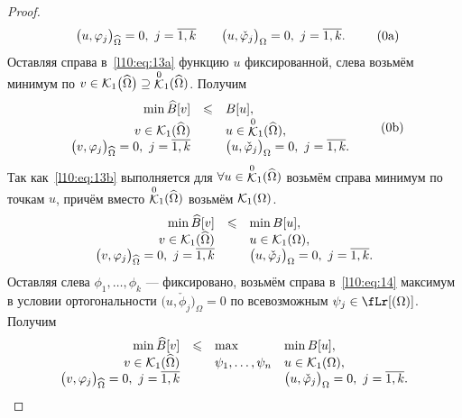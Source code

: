 \begin{proof}
\begin{equation}
\begin{array}{rcl}
			\big(u,\phi_j\big)_{\widehat{\Omega}}=0,\ j=\overline{1,k}&  &\big(u,\check{\phi}_j\big)_{\Omega}=0,\ j=\overline{1,k}.
		\end{array}\tag{\theequation a}\hfill
	\end{equation} 
	Оставляя справа в~\eqref{l10:eq:13a} функцию $u$ фиксированной, слева возьмём минимум по $v\in\mathcal{K}_1\big(\widehat{\Omega}\big)\supseteq{\mathop{\ensuremath{\mathcal{K}}}\limits^0}_1(\widehat{\Omega})$. Получим
	\begin{equation}\label{l10:eq:13b}
		\hfill\begin{array}{rcl}
			\min\widehat{B}[v]&\leqslant&B[u],\\
			v\in\K_1(\widehat{\Omega})& &u\in{\mathop{\K}\limits^0}_1(\widehat{\Omega}),\\
			\big(v,\phi_j\big)_{\widehat{\Omega}}=0,\ j=\overline{1,k}&  &\big(u,\check{\phi}_j\big)_{\Omega}=0,\ j=\overline{1,k}.
		\end{array}\tag{\theequation b}\hfill
	\end{equation} 
	Так как~\eqref{l10:eq:13b} выполняется для $\forall u\in{\mathop{\ensuremath{\mathcal{K}}}\limits^0}_1(\widehat{\Omega})$ возьмём справа минимум по точкам $u$, причём вместо ${\mathop{\mathcal{K}}\limits^0}_1(\widehat{\Omega})$ возьмём $\mathcal{K}_1(\Omega)$.
	\begin{equation}\label{l10:eq:14}
		\hfill\begin{array}{rcl}
			\min\widehat{B}[v]&\leqslant&\min B[u],\\
			v\in\K_1(\widehat{\Omega})& &u\in\K_1(\Omega),\\
			\big(v,\phi_j\big)_{\widehat{\Omega}}=0,\ j=\overline{1,k}&  &\big(u,\check{\phi}_j\big)_{\Omega}=0,\ j=\overline{1,k}.
		\end{array}\hfill
	\end{equation} 
	Оставляя слева $\phi_1,\ldots,\phi_k$ --- фиксировано, возьмём справа в~\eqref{l10:eq:14} максимум в условии ортогональности $\big(u,\check{\phi}_j\big)_{\Omega}=0$ по всевозможным $\psi_j\in\fLr[(\Omega)]$. Получим
	\begin{equation}\label{l10:eq:15}
		\hfill\begin{array}{rcll}
			\min\widehat{B}[v]&\leqslant&\max&\min B[u],\\
			v\in\K_1(\widehat{\Omega})&  &\psi_1,\ldots,\psi_n &u\in\K_1(\Omega),\\
			\big(v,\phi_j\big)_{\widehat{\Omega}}=0,\ j=\overline{1,k}& &   &\big(u,\check{\phi}_j\big)_{\Omega}=0,\ j=\overline{1,k}.
		\end{array}\hfill
	\end{equation}

\end{proof}
